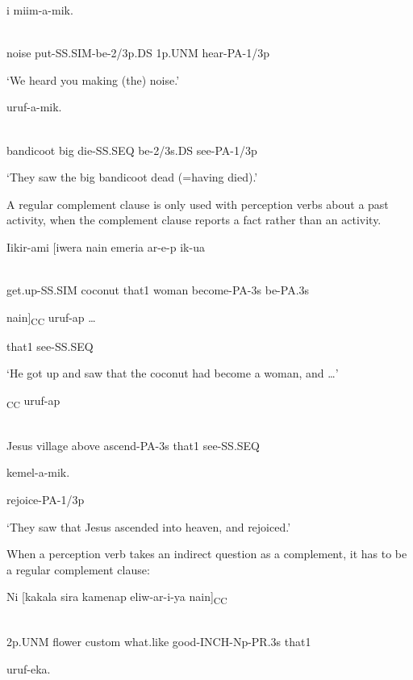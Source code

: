 \ea%
\label{ex:x1512}
  i  miim-a-mik. \\
      \\
\glt
\z

noise  put-SS.SIM-be-2/3p.DS  1p.UNM  hear-PA-1/3p

`We heard you making (the) noise.'

\ea%
\label{ex:x1600}
  uruf-a-mik. \\
      \\
\glt
\z

bandicoot  big  die-SS.SEQ  be-2/3s.DS  see-PA-1/3p

`They saw the big bandicoot dead (=having died).'

A regular complement clause is only used with perception verbs about a past activity, when the complement clause reports a fact rather than an activity. 

\ea%
\label{ex:x1628}
\gll Iikir-ami  [iwera  nain  emeria  ar-e-p  ik-ua \\
      \\
\glt
\z

get.up-SS.SIM  coconut  that1  woman  become-PA-3s  be-PA.3s

nain]\textsubscript{CC}  uruf-ap  {\dots}

that1  see-SS.SEQ

`He got up and saw that the coconut had become a woman, and {\dots}'

\ea%
\label{ex:x1629}
\textsubscript{CC}  uruf-ap \\
      \\
\glt
\z

Jesus  village  above  ascend-PA-3s  that1  see-SS.SEQ  

kemel-a-mik.

rejoice-PA-1/3p

`They saw that Jesus ascended into heaven, and rejoiced.'

When a perception verb takes an indirect question as a complement, it has to be a regular complement clause:

\ea%
\label{ex:x1631}
\gll Ni  [kakala  sira  kamenap  eliw-ar-i-ya  nain]\textsubscript{CC} \\
      \\
\glt
\z

2p.UNM  flower  custom  what.like  good-INCH-Np-PR.3s  that1

uruf-eka.


